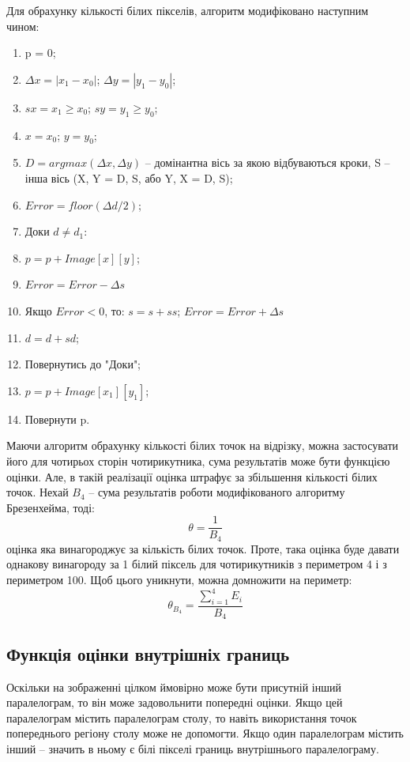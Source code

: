 \documentclass[a4paper,14pt]{report}
\begin{document}
Для обрахунку кількості білих пікселів, алгоритм модифіковано наступним чином:
\begin{enumerate}
  \item p = 0;
  \item $\Delta x = |x_1 - x_0|$; $\Delta y = |y_1 - y_0|$;
  \item $sx = x_1 \geq x_0$; $sy = y_1 \geq y_0$;
  \item $x = x_0$; $y = y_0$;
  \item $D = argmax(\Delta x, \Delta y)$ -- домінантна вісь за якою відбуваються кроки, S -- інша вісь (X, Y = D, S, або Y, X = D, S);
  \item $Error = floor(\Delta d / 2)$;
  \item Доки $d \neq d_1$:
  \item $p = p + Image[x][y]$;
  \item $Error = Error -  \Delta s$
  \item Якщо $Error < 0$, то: $s = s + ss$; $Error = Error + \Delta s$
  \item $d = d + sd$;
  \item Повернутись до "Доки";
  \item $p = p + Image[x_1][y_1]$;
  \item Повернути p.
\end{enumerate}

Маючи алгоритм обрахунку кількості білих точок на відрізку, можна застосувати його для чотирьох сторін чотирикутника, сума результатів може бути функцією оцінки. 
Але, в такій реалізації оцінка штрафує за збільшення кількості білих точок. 
Нехай $B_4$ -- сума результатів роботи модифікованого алгоритму Брезенхейма, тоді:
\[
\theta = \frac{1}{B_4}
\]
оцінка яка винагороджує за кількість білих точок. Проте, така оцінка буде давати однакову винагороду за 1 білий піксель для чотирикутників з периметром 4 і з периметром 100.
Щоб цього уникнути, можна домножити на периметр:
\[
\theta_{B_4} = \frac{\sum\limits_{i=1}^{4}E_i}{B_4}
\]

\subsection{Функція оцінки внутрішніх границь}
Оскільки на зображенні цілком ймовірно може бути присутній інший паралелограм, то він може задовольнити попередні оцінки. 
Якщо цей паралелограм містить паралелограм столу, то навіть використання точок попереднього регіону столу може не допомогти. 
Якщо один паралелограм містить інший -- значить в ньому є білі пікселі границь внутрішнього паралелограму.
\end{document}
